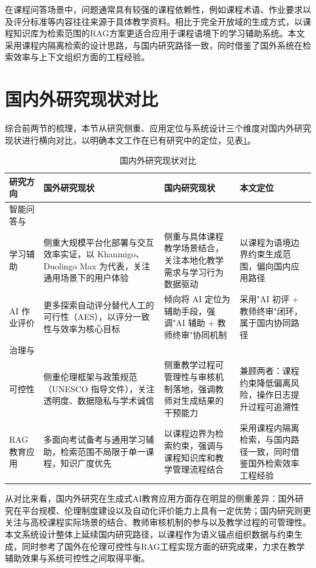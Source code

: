 \documentclass[12pt,a4paper,oneside]{ctexbook}
\numberwithin{equation}{chapter}
\begin{document}
在课程问答场景中，问题通常具有较强的课程依赖性，例如课程术语、作业要求以及评分标准等内容往往来源于具体教学资料。相比于完全开放域的生成方式，以课程知识库为检索范围的RAG方案更适合应用于课程语境下的学习辅助系统。本文采用课程内隔离检索的设计思路，与国内研究路径一致，同时借鉴了国外系统在检索效率与上下文组织方面的工程经验。

\section{国内外研究现状对比}

综合前两节的梳理，本节从研究侧重、应用定位与系统设计三个维度对国内外研究现状进行横向对比，以明确本文工作在已有研究中的定位，见表\ref{tab:researchComparison}。

\begin{table}[H]
\centering
\caption{国内外研究现状对比}
\label{tab:researchComparison}
\begin{tabular}{p{2.8cm}p{4.5cm}p{4.5cm}p{2.8cm}}
\toprule
研究方向 & 国外研究现状 & 国内研究现状 & 本文定位 \\
\midrule
智能问答与\\学习辅助 &
侧重大规模平台化部署与交互效率实证，以 Khanmigo、Duolingo Max 为代表，关注通用场景下的用户体验 &
侧重与具体课程教学场景结合，关注本地化教学需求与学习行为数据驱动 &
以课程为语境边界约束生成范围，偏向国内应用路径 \\
\addlinespace
AI 作业评价 &
更多探索自动评分替代人工的可行性（AES），以评分一致性与效率为核心目标 &
倾向将 AI 定位为辅助手段，强调"AI 辅助 + 教师终审"协同机制 &
采用"AI 初评 + 教师终审"闭环，属于国内协同路径 \\
\addlinespace
治理与\\可控性 &
侧重伦理框架与政策规范（UNESCO 指导文件），关注透明度、数据隐私与学术诚信 &
侧重教学过程可管理性与审核机制落地，强调教师对生成结果的干预能力 &
兼顾两者：课程约束降低偏离风险，操作日志提升过程可追溯性 \\
\addlinespace
RAG 教育应用 &
多面向考试备考与通用学习辅助，检索范围不局限于单一课程，知识广度优先 &
以课程边界为检索约束，强调与课程知识库和教学管理流程结合 &
采用课程内隔离检索，与国内路径一致，同时借鉴国外检索效率工程经验 \\
\bottomrule
\end{tabular}
\end{table}

从对比来看，国内外研究在生成式AI教育应用方面存在明显的侧重差异：国外研究在平台规模、伦理制度建设以及自动化评价能力上具有一定优势；国内研究则更关注与高校课程实际场景的结合、教师审核机制的参与以及教学过程的可管理性。本文系统设计整体上延续国内研究路径，以课程作为语义锚点组织数据与约束生成，同时参考了国外在伦理可控性与RAG工程实现方面的研究成果，力求在教学辅助效果与系统可控性之间取得平衡。
\end{document}

